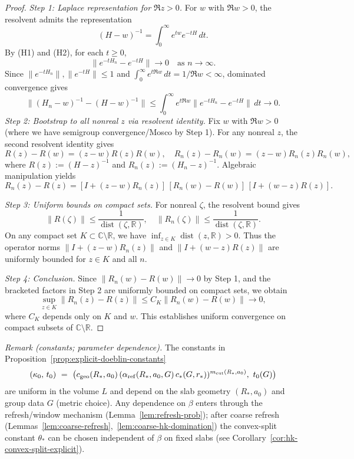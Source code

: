 \documentclass[11pt]{amsart}
\theoremstyle{plain}
\theoremstyle{definition}
\theoremstyle{remark}
\begin{document}
\begin{proof}
\emph{Step 1: Laplace representation for $\Re z > 0$.} For $w$ with $\Re w > 0$, the resolvent admits the representation
\[
  (H-w)^{-1} = \int_0^\infty e^{tw} e^{-tH}\,dt.
\]
By (H1) and (H2), for each $t \ge 0$,
\[
  \|e^{-tH_n} - e^{-tH}\| \to 0 \quad \text{as } n \to \infty.
\]
Since $\|e^{-tH_n}\|, \|e^{-tH}\| \le 1$ and $\int_0^\infty e^{t\Re w}\,dt = 1/\Re w < \infty$, dominated convergence gives
\[
  \|(H_n-w)^{-1} - (H-w)^{-1}\| \le \int_0^\infty e^{t\Re w} \|e^{-tH_n} - e^{-tH}\|\,dt \to 0.
\]
\emph{Step 2: Bootstrap to all nonreal $z$ via resolvent identity.} Fix $w$ with $\Re w > 0$ (where we have semigroup convergence/Mosco by Step 1). For any nonreal $z$, the second resolvent identity gives
\[
  R(z) - R(w) = (z-w)R(z)R(w), \quad R_n(z) - R_n(w) = (z-w)R_n(z)R_n(w),
\]
where $R(z) := (H-z)^{-1}$ and $R_n(z) := (H_n-z)^{-1}$. Algebraic manipulation yields
\[
  R_n(z) - R(z) = [I + (z-w)R_n(z)]\,[R_n(w) - R(w)]\,[I + (w-z)R(z)].
\]

\emph{Step 3: Uniform bounds on compact sets.} For nonreal $\zeta$, the resolvent bound gives
\[
  \|R(\zeta)\| \le \frac{1}{\operatorname{dist}(\zeta,\mathbb{R})}, \quad \|R_n(\zeta)\| \le \frac{1}{\operatorname{dist}(\zeta,\mathbb{R})}.
\]
On any compact set $K \subset \mathbb{C} \setminus \mathbb{R}$, we have $\inf_{z \in K} \operatorname{dist}(z,\mathbb{R}) > 0$. Thus the operator norms $\|I + (z-w)R_n(z)\|$ and $\|I + (w-z)R(z)\|$ are uniformly bounded for $z \in K$ and all $n$.

\emph{Step 4: Conclusion.} Since $\|R_n(w) - R(w)\| \to 0$ by Step 1, and the bracketed factors in Step 2 are uniformly bounded on compact sets, we obtain
\[
  \sup_{z \in K} \|R_n(z) - R(z)\| \le C_K \|R_n(w) - R(w)\| \to 0,
\]
where $C_K$ depends only on $K$ and $w$. This establishes uniform convergence on compact subsets of $\mathbb{C} \setminus \mathbb{R}$.
\end{proof}

\noindent\emph{Remark (constants; parameter dependence).} The constants in Proposition~\ref{prop:explicit-doeblin-constants}
\[
  (\kappa_0,\,t_0)\ =\ \big(c_{\rm geo}(R_*,a_0)\,(\alpha_{\rm ref}(R_*,a_0,G)\,c_*(G,r_*))^{m_{\rm cut}(R_*,a_0)},\ t_0(G)\big)
\]
are uniform in the volume $L$ and depend on the slab geometry $(R_*,a_0)$ and group data $G$ (metric choice). Any dependence on $\beta$ enters through the refresh/window mechanism (Lemma~\ref{lem:refresh-prob}); after coarse refresh (Lemmas~\ref{lem:coarse-refresh},~\ref{lem:coarse-hk-domination}) the convex-split constant $\theta_*$ can be chosen independent of $\beta$ on fixed slabs (see Corollary~\ref{cor:hk-convex-split-explicit}).
\end{document}
